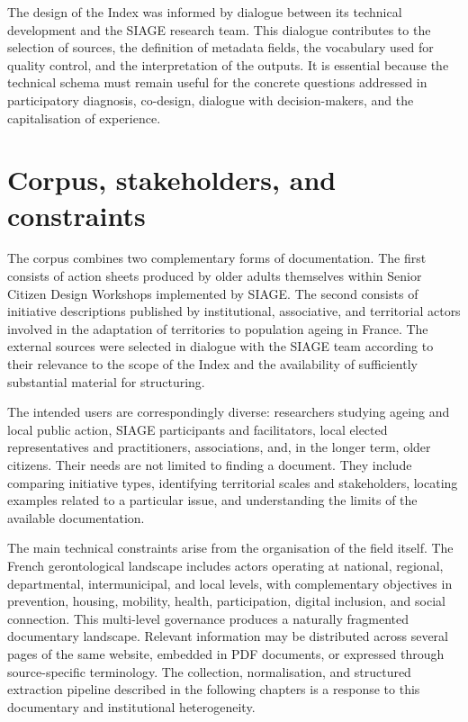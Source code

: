 The design of the Index was informed by dialogue between its technical development
and the SIAGE research team. This dialogue contributes to the selection of sources,
the definition of metadata fields, the vocabulary used for quality control, and the
interpretation of the outputs. It is essential because the technical schema must
remain useful for the concrete questions addressed in participatory diagnosis,
co-design, dialogue with decision-makers, and the capitalisation of experience.

\section{Corpus, stakeholders, and constraints}

The corpus combines two complementary forms of documentation. The first consists
of action sheets produced by older adults themselves within Senior Citizen Design
Workshops implemented by SIAGE. The second consists of initiative descriptions
published by institutional, associative, and territorial actors involved in the
adaptation of territories to population ageing in France. The external sources were
selected in dialogue with the SIAGE team according to their relevance to the scope
of the Index and the availability of sufficiently substantial material for
structuring.

The intended users are correspondingly diverse: researchers studying ageing and
local public action, SIAGE participants and facilitators, local elected
representatives and practitioners, associations, and, in the longer term, older
citizens. Their needs are not limited to finding a document. They include comparing
initiative types, identifying territorial scales and stakeholders, locating examples
related to a particular issue, and understanding the limits of the available
documentation.

The main technical constraints arise from the organisation of the field itself.
The French gerontological landscape includes actors operating at national,
regional, departmental, intermunicipal, and local levels, with complementary
objectives in prevention, housing, mobility, health, participation, digital
inclusion, and social connection. This multi-level governance produces a naturally
fragmented documentary landscape. Relevant information may be distributed across
several pages of the same website, embedded in PDF documents, or expressed through
source-specific terminology. The collection, normalisation, and structured
extraction pipeline described in the following chapters is a response to this
documentary and institutional heterogeneity.
